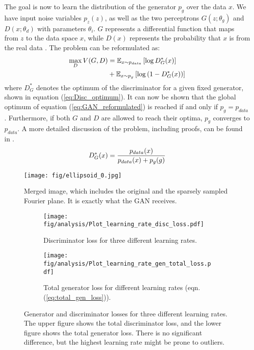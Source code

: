 The goal is now to learn the distribution of the generator $p_g$ over the data $x$. We have input noise variables $p_z(z)$, as well as the two perceptrons $G(z; \theta_g)$ and $D(x; \theta_d)$ with parameters $\theta_i$. $G$ represents a differential function that maps from $z$ to the data space $x$, while $D(x)$ represents the probability that $x$ is from the real data \cite{goodfellow2014generative}. The problem can be reformulated as: 
\begin{equation}
	\centering
	\begin{aligned}
		\max_{D} V(G, D) &= \mathbb{E}_{x \sim p_{data}} \left[ \log D^{*}_{G}(x) \right] \\ 
		&+ \mathbb{E}_{x \sim p_{g}} \left[ \log \left( 1 - D^{*}_{G}(x) \right) \right]
	\end{aligned}
	\label{eq:GAN_reformulated}
\end{equation}
where $D^{*}_{G}$ denotes the optimum of the discriminator for a given fixed generator, shown in equation (\ref{eq:Disc_optimum}). It can now be shown that the global optimum of equation (\ref{eq:GAN_reformulated}) is reached if and only if $p_g = p_{data}$. Furthermore, if both $G$ and $D$ are allowed to reach their optima, $p_g$ converges to $p_{data}$. A more detailed discussion of the problem, including proofs, can be found in \cite{goodfellow2014generative}. 
\begin{equation}
	\centering
	D^*_G(x) = \frac{p_{data}(x)}{p_{data}(x) + p_g(g)}
	\label{eq:Disc_optimum}
\end{equation}
\begin{figure}
	\centering
	\texttt{[image: fig/ellipsoid\_0.jpg]}
	\caption{Merged image, which includes the original and the sparsely sampled Fourier plane. It is exactly what the GAN receives. }
	\label{fig:GANinput}
\end{figure}
\begin{figure}
	\centering
	\begin{subfigure}{\linewidth}
		\centering
		\texttt{[image: fig/analysis/Plot\_learning\_rate\_disc\_loss.pdf]}
		\caption{Discriminator loss for three different learning rates. }
		\label{fig:Plot_learning_rate_discloss}
	\end{subfigure}\hfill
	\begin{subfigure}{\linewidth}
		\centering
		\texttt{[image: fig/analysis/Plot\_learning\_rate\_gen\_total\_loss.pdf]}
		\caption{Total generator loss for different learning rates (eqn. (\ref{eq:total_gen_loss})).}
		\label{fig:Plot_learning_rate_genloss}
	\end{subfigure}\hfill
	\caption{Generator and discriminator losses for three different learning rates. The upper figure shows the total discriminator loss, and the lower figure shows the total generator loss. There is no significant difference, but the highest learning rate might be prone to outliers. }
	\label{fig:Plot_learning_rate_loss}
\end{figure}
